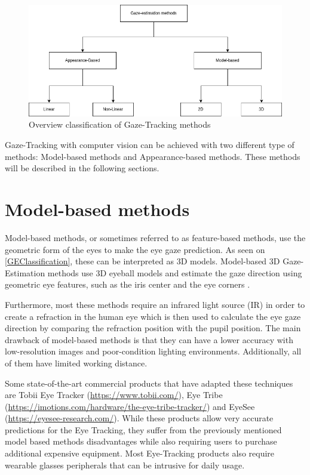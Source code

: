 \begin{figure}
    \centering
    \includegraphics[scale=0.6]{img/figures/methods_classification.png}
    \caption{Overview classification of Gaze-Tracking methods }
    \label{GEClassification}
 \end{figure}


Gaze-Tracking with computer vision can be achieved with two different type of methods: Model-based methods and Appearance-based methods. These methods will be described in the following sections.

\section{Model-based methods}
Model-based methods, or sometimes referred to as feature-based methods, use the geometric form of the eyes to make the eye gaze prediction.
As seen on \autoref{GEClassification}, these can be interpreted as 3D models. Model-based 3D Gaze-Estimation
methods use 3D eyeball models and estimate the gaze direction using geometric eye features, such as the iris center and the eye corners \cite{general_theory_remote_gaze_3d_model}.

Furthermore, most these methods require an infrared light source (IR) in order to create a refraction in the human eye which is then used to calculate the eye gaze direction by comparing the refraction position with the pupil position. The main drawback of model-based methods is that they can have a lower accuracy with low-resolution images and poor-condition lighting environments. Additionally, all of them have limited working distance.

Some state-of-the-art commercial products that have adapted these techniques are Tobii Eye Tracker (\url{https://www.tobii.com/}), Eye Tribe (\url{https://imotions.com/hardware/the-eye-tribe-tracker/}) and EyeSee (\url{https://eyesee-research.com/}). 
While these products allow very accurate predictions for the Eye Tracking, they suffer from the previously mentioned model based methods disadvantages while also requiring users to purchase additional expensive equipment. Most Eye-Tracking products also require wearable glasses peripherals that can be intrusive for daily usage. 

